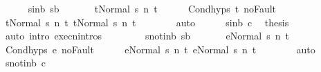 \begin{isabellebody}
\ \ \ \ \isamarkupfalse%
\ s{\isacharunderscore}in{\isacharunderscore}b{\isacharcolon}\ {\isachardoublequoteopen}s{\isasymin}b{\isachardoublequoteclose}\ \isanewline
\ \ \ \ \isamarkupfalse%
\ {\isachardoublequoteopen}{\isasymGamma}{\isasymturnstile}{\isasymlangle}t{}{\isacharcomma}Normal\ s{\isasymrangle}\ {\isacharequal}n{\isasymRightarrow}\ t{\isachardoublequoteclose}\isanewline
\ \ \ \ \isamarkupfalse%
\ Cond{\isachardot}hyps\ t{}\ noFault\isanewline
\ \ \ \ \isamarkupfalse%
\ {\isachardoublequoteopen}{\isasymGamma}{\isasymturnstile}{\isasymlangle}t{}{\isacharcomma}Normal\ s{\isasymrangle}\ {\isacharequal}n{\isasymRightarrow}\ t{\isachardoublequoteclose}\ {\isachardoublequoteopen}{\isasymGamma}{\isasymturnstile}{\isasymlangle}t{}{\isacharcomma}Normal\ s{\isasymrangle}\ {\isacharequal}n{\isasymRightarrow}\ t{\isachardoublequoteclose}\isanewline
\ \ \ \ \ \ \isamarkupfalse%
\ auto\isanewline
\ \ \ \ \isamarkupfalse%
\ s{\isacharunderscore}in{\isacharunderscore}b\ c{}\ \isamarkupfalse%
\ {\isacharquery}thesis\isanewline
\ \ \ \ \ \ \isamarkupfalse%
\ {\isacharparenleft}auto\ intro{\isacharcolon}\ execn{\isachardot}intros{\isacharparenright}\isanewline
\ \ \isamarkupfalse%
\isanewline
\ \ \ \ \isamarkupfalse%
\ s{\isacharunderscore}notin{\isacharunderscore}b{\isacharcolon}\ {\isachardoublequoteopen}s{\isasymnotin}b{\isachardoublequoteclose}\ \isanewline
\ \ \ \ \isamarkupfalse%
\ {\isachardoublequoteopen}{\isasymGamma}{\isasymturnstile}{\isasymlangle}e{}{\isacharcomma}Normal\ s{\isasymrangle}\ {\isacharequal}n{\isasymRightarrow}\ t{\isachardoublequoteclose}\isanewline
\ \ \ \ \isamarkupfalse%
\ Cond{\isachardot}hyps\ e{}\ noFault\isanewline
\ \ \ \ \isamarkupfalse%
\ {\isachardoublequoteopen}{\isasymGamma}{\isasymturnstile}{\isasymlangle}e{}{\isacharcomma}Normal\ s{\isasymrangle}\ {\isacharequal}n{\isasymRightarrow}\ t{\isachardoublequoteclose}\ {\isachardoublequoteopen}{\isasymGamma}{\isasymturnstile}{\isasymlangle}e{}{\isacharcomma}Normal\ s{\isasymrangle}\ {\isacharequal}n{\isasymRightarrow}\ t{\isachardoublequoteclose}\isanewline
\ \ \ \ \ \ \isamarkupfalse%
\ auto\isanewline
\ \ \ \ \isamarkupfalse%
\ s{\isacharunderscore}notin{\isacharunderscore}b\ c{}\ \isamarkupfalse%

\end{isabellebody}
